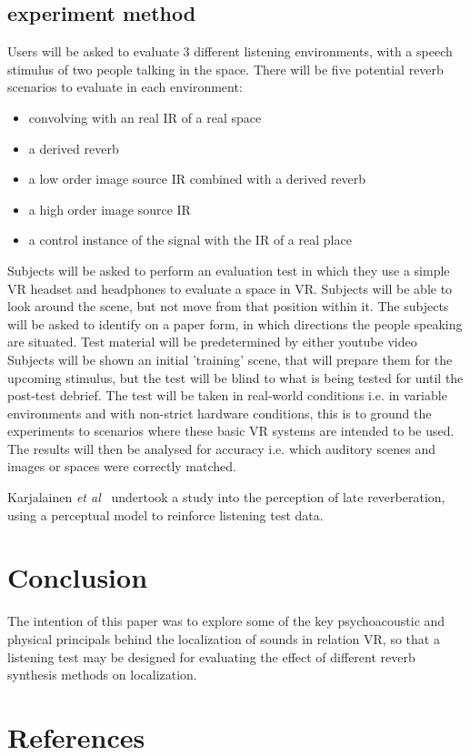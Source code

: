 \documentclass[paper=a4, fontsize=10pt, font=arial]{scrartcl} %
\numberwithin{equation}{section} %
\numberwithin{figure}{section} %
\numberwithin{table}{section} %
\begin{document}
\subsection{experiment method}
Users will be asked to evaluate 3 different listening environments, with a speech stimulus of two people talking in the space. There will be five potential reverb scenarios to evaluate in each environment: 
\begin{itemize}
\item convolving with an real IR of a real space
\item a derived reverb
\item a low order image source IR combined with a derived reverb
\item a high order image source IR
\item a control instance of the signal with the IR of a real place
\end{itemize}
Subjects will be asked to perform an evaluation test in which they use a simple VR headset and headphones to evaluate a space in VR. Subjects will be able to look around the scene, but not move from that position within it. The subjects will be asked to identify on a paper form, in which directions the people speaking are situated. Test material will be predetermined by either youtube video Subjects will be shown an initial 'training' scene, that will prepare them for the upcoming stimulus, but the test will be blind to what is being tested for until the post-test debrief. The test will be taken in real-world conditions i.e. in variable environments and with non-strict hardware conditions, this is to ground the experiments to scenarios where these basic VR systems are intended to be used. The results will then be analysed for accuracy i.e. which auditory scenes and images or spaces were correctly matched.

Karjalainen \textit{et al}~\cite{Karjalainen2001} undertook a study into the perception of late reverberation, using a perceptual model to reinforce listening test data.

\section{Conclusion}
The intention of this paper was to explore some of the key psychoacoustic and physical principals behind the localization of sounds in relation VR, so that a listening test may be designed for evaluating the effect of different reverb synthesis methods on localization. 

\newpage
\section{References}

{}

\end{document}
